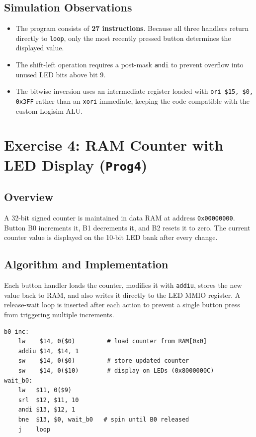 \documentclass[12pt,a4paper]{article}
\begin{document}
\subsection{Simulation Observations}
\begin{itemize}
    \item The program consists of \textbf{27 instructions}. Because all three handlers return directly to \texttt{loop}, only the most recently pressed button determines the displayed value.
    \item The shift-left operation requires a post-mask \texttt{andi} to prevent overflow into unused LED bits above bit 9.
    \item The bitwise inversion uses an intermediate register loaded with \texttt{ori \$15, \$0, 0x3FF} rather than an \texttt{xori} immediate, keeping the code compatible with the custom Logisim ALU.
\end{itemize}

\newpage
\section{Exercise 4: RAM Counter with LED Display (\texttt{Prog4})}

\subsection{Overview}
A 32-bit signed counter is maintained in data RAM at address \texttt{0x00000000}. Button B0 increments it, B1 decrements it, and B2 resets it to zero. The current counter value is displayed on the 10-bit LED bank after every change.

\subsection{Algorithm and Implementation}
Each button handler loads the counter, modifies it with \texttt{addiu}, stores the new value back to RAM, and also writes it directly to the LED MMIO register. A release-wait loop is inserted after each action to prevent a single button press from triggering multiple increments.

\begin{lstlisting}[style=mips, caption={Increment Handler with Release-Wait (B0)}]
b0_inc:
    lw    $14, 0($0)         # load counter from RAM[0x0]
    addiu $14, $14, 1
    sw    $14, 0($0)         # store updated counter
    sw    $14, 0($10)        # display on LEDs (0x8000000C)
wait_b0:
    lw   $11, 0($9)
    srl  $12, $11, 10
    andi $13, $12, 1
    bne  $13, $0, wait_b0   # spin until B0 released
    j    loop
\end{lstlisting}
\end{document}

